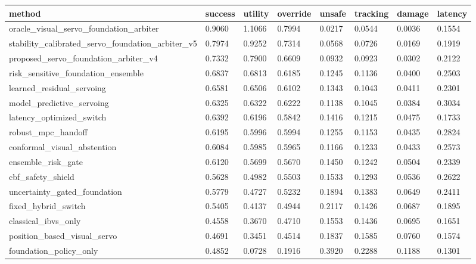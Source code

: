 \begin{tabular}{llllllll}
\toprule
method & success & utility & override & unsafe & tracking & damage & latency \\
\midrule
oracle\_visual\_servo\_foundation\_arbiter & 0.9060 & 1.1066 & 0.7994 & 0.0217 & 0.0544 & 0.0036 & 0.1554 \\
stability\_calibrated\_servo\_foundation\_arbiter\_v5 & 0.7974 & 0.9252 & 0.7314 & 0.0568 & 0.0726 & 0.0169 & 0.1919 \\
proposed\_servo\_foundation\_arbiter\_v4 & 0.7332 & 0.7900 & 0.6609 & 0.0932 & 0.0923 & 0.0302 & 0.2122 \\
risk\_sensitive\_foundation\_ensemble & 0.6837 & 0.6813 & 0.6185 & 0.1245 & 0.1136 & 0.0400 & 0.2503 \\
learned\_residual\_servoing & 0.6581 & 0.6506 & 0.6102 & 0.1343 & 0.1043 & 0.0411 & 0.2301 \\
model\_predictive\_servoing & 0.6325 & 0.6322 & 0.6222 & 0.1138 & 0.1045 & 0.0384 & 0.3034 \\
latency\_optimized\_switch & 0.6392 & 0.6196 & 0.5842 & 0.1416 & 0.1215 & 0.0475 & 0.1733 \\
robust\_mpc\_handoff & 0.6195 & 0.5996 & 0.5994 & 0.1255 & 0.1153 & 0.0435 & 0.2824 \\
conformal\_visual\_abstention & 0.6084 & 0.5985 & 0.5965 & 0.1166 & 0.1233 & 0.0433 & 0.2573 \\
ensemble\_risk\_gate & 0.6120 & 0.5699 & 0.5670 & 0.1450 & 0.1242 & 0.0504 & 0.2339 \\
cbf\_safety\_shield & 0.5628 & 0.4982 & 0.5503 & 0.1533 & 0.1293 & 0.0536 & 0.2622 \\
uncertainty\_gated\_foundation & 0.5779 & 0.4727 & 0.5232 & 0.1894 & 0.1383 & 0.0649 & 0.2411 \\
fixed\_hybrid\_switch & 0.5405 & 0.4137 & 0.4944 & 0.2117 & 0.1426 & 0.0687 & 0.1895 \\
classical\_ibvs\_only & 0.4558 & 0.3670 & 0.4710 & 0.1553 & 0.1436 & 0.0695 & 0.1651 \\
position\_based\_visual\_servo & 0.4691 & 0.3451 & 0.4514 & 0.1837 & 0.1585 & 0.0760 & 0.1574 \\
foundation\_policy\_only & 0.4852 & 0.0728 & 0.1916 & 0.3920 & 0.2288 & 0.1188 & 0.1301 \\
\bottomrule
\end{tabular}
